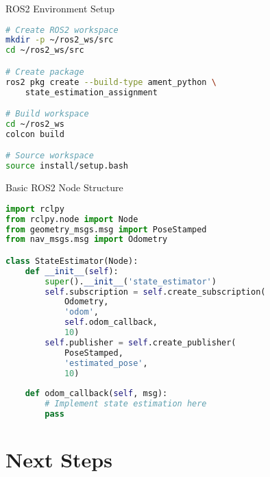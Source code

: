 \documentclass[aspectratio=169]{beamer}
\begin{document}
\begin{frame}{ROS2 Environment Setup}
    \begin{lstlisting}[language=bash]
# Create ROS2 workspace
mkdir -p ~/ros2_ws/src
cd ~/ros2_ws/src

# Create package
ros2 pkg create --build-type ament_python \
    state_estimation_assignment

# Build workspace
cd ~/ros2_ws
colcon build

# Source workspace
source install/setup.bash
    \end{lstlisting}
\end{frame}

\begin{frame}{Basic ROS2 Node Structure}
    \begin{lstlisting}[language=Python]
import rclpy
from rclpy.node import Node
from geometry_msgs.msg import PoseStamped
from nav_msgs.msg import Odometry

class StateEstimator(Node):
    def __init__(self):
        super().__init__('state_estimator')
        self.subscription = self.create_subscription(
            Odometry,
            'odom',
            self.odom_callback,
            10)
        self.publisher = self.create_publisher(
            PoseStamped,
            'estimated_pose',
            10)
            
    def odom_callback(self, msg):
        # Implement state estimation here
        pass
    \end{lstlisting}
\end{frame}

\section{Next Steps}
\end{document}
